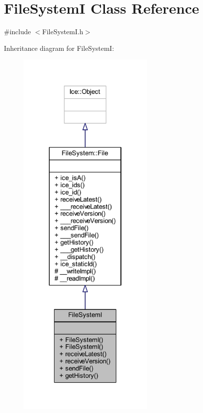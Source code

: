\hypertarget{class_file_system_i}{}\section{File\+System\+I Class Reference}
\label{class_file_system_i}


{\ttfamily \#include $<$File\+System\+I.\+h$>$}



Inheritance diagram for File\+System\+I\+:
\nopagebreak
\begin{figure}[H]
\begin{center}
\leavevmode
\includegraphics[width=190pt]{class_file_system_i__inherit__graph}
\end{center}
\end{figure}


